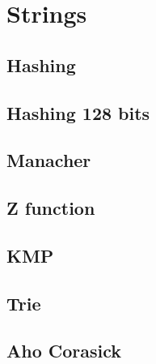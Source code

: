 \section{Strings}

\subsection{Hashing}


\subsection{Hashing 128 bits}


\subsection{Manacher}


\subsection{Z function}


\subsection{KMP}


\subsection{Trie}


\subsection{Aho Corasick}
